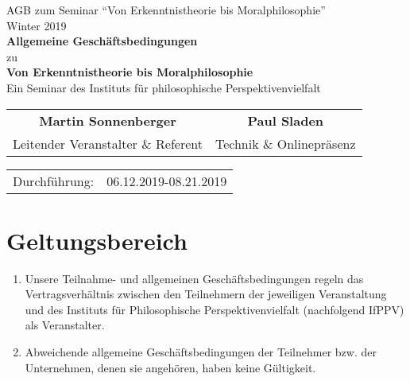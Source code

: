 \documentclass[a4paper, 12pt]{scrartcl}
\begin{document}
    \begin{titlepage}
        \begin{center}
            
	    \large {AGB zum Seminar \enquote{Von Erkenntnistheorie bis Moralphilosophie}} \\
            Winter 2019 \\
            \vspace{3cm}
            \textbf{ \Huge Allgemeine Gesch\"aftsbedingungen} \\
            \vspace{0.5cm}
            \large zu \\
            \vspace{1.5cm}
            \textbf{ \Large Von Erkenntnistheorie bis Moralphilosophie} \\
            \large Ein Seminar des Instituts f\"ur philosophische Perspektivenvielfalt

            \vspace{3cm}

            \begin{tabularx}{\textwidth}{CC}
            \textbf{Martin Sonnenberger} & \textbf{Paul Sladen} \\
            Leitender Veranstalter \& Referent & Technik \& Onlinepr\"asenz\\
            \end{tabularx}
           
            \vfill
            
            \begin{tabularx}{\textwidth}{XX}
                Durchführung: & 06.12.2019-08.21.2019
            \end{tabularx}
         \end{center}
    \end{titlepage}

    \section{Geltungsbereich}
    \begin{enumerate}
	    \item Unsere Teilnahme- und allgemeinen Geschäftsbedingungen regeln das Vertragsverhältnis zwischen den Teilnehmern der jeweiligen Veranstaltung und des Instituts f\"ur Philosophische Perspektivenvielfalt (nachfolgend IfPPV) als Veranstalter. 
	    
	    \item Abweichende allgemeine Geschäftsbedingungen der Teilnehmer bzw. der Unternehmen, denen sie angehören, haben keine Gültigkeit.
    \end{enumerate}
\end{document}
